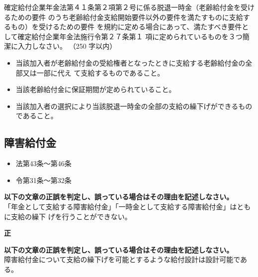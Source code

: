 \begin{shortanswer}[年金1 2024 問題2(1)エ]
  確定給付企業年金法第４１条第２項第２号に係る脱退一時金（老齢給付金を受けるための要件
のうち老齢給付金支給開始要件以外の要件を満たすものに支給するもの）を受けるための要件
を規約に定める場合にあって、満たすべき要件として確定給付企業年金法施行令第２７条第１
項に定められているものを３つ簡潔に入力しなさい。 （250 字以内）
\end{shortanswer}

\begin{answerbox}
  \begin{itemize}
    \item 当該加入者が老齢給付金の受給権者となったときに支給する老齢給付金の全部又は一部に代え
て支給するものであること。
\item 当該老齢給付金に保証期間が定められていること。
\item 当該加入者の選択により当該脱退一時金の全部の支給の繰下げができるものであること。
  \end{itemize}
\end{answerbox}

\newpage

\subsection{障害給付金}

\begin{InyouJobunbox}
  \begin{itemize}
    \item 法第43条〜第46条
    \item 令第31条〜第32条
  \end{itemize}
\end{InyouJobunbox}

\begin{truefalse}[年金1 H28 問題2(1)\textcircled{1}]
  \textbf{以下の文章の正誤を判定し、誤っている場合はその理由を記述しなさい。}
  \\

  「年金として支給する障害給付金」「一時金として支給する障害給付金」はともに支給の繰下
げを行うことができない。
\end{truefalse}

\begin{answerbox}
  \textbf{正}
\end{answerbox}



\begin{truefalse}[年金1 2025 問題1(3)エ\textcircled{3}]
\textbf{以下の文章の正誤を判定し、誤っている場合はその理由を記述しなさい。}
  \\

障害給付金について支給の繰下げを可能とするような給付設計は設計可能である。
\end{truefalse}

